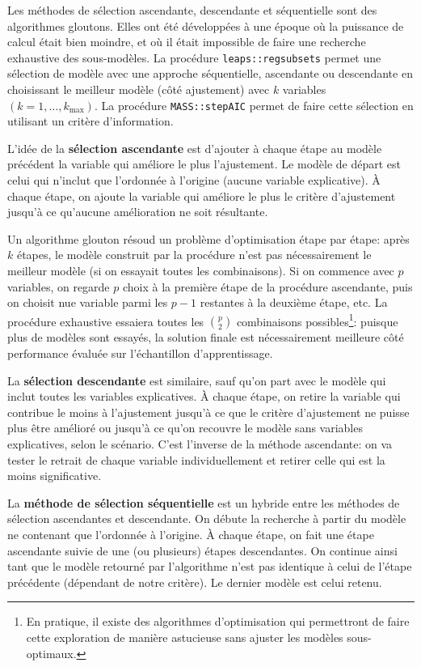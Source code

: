 \documentclass[
  11pt,
  letterpaper,
]{scrbook}
\theoremstyle{definition}
\theoremstyle{remark}
\begin{document}
Les méthodes de sélection ascendante, descendante et séquentielle sont
des algorithmes gloutons. Elles ont été développées à une époque où la
puissance de calcul était bien moindre, et où il était impossible de
faire une recherche exhaustive des sous-modèles. La procédure
\texttt{leaps::regsubsets} permet une sélection de modèle avec une
approche séquentielle, ascendante ou descendante en choisissant le
meilleur modèle (côté ajustement) avec \(k\) variables
\((k=1, \ldots, k_{\text{max}})\). La procédure \texttt{MASS::stepAIC}
permet de faire cette sélection en utilisant un critère d'information.

L'idée de la \textbf{sélection ascendante} est d'ajouter à chaque étape
au modèle précédent la variable qui améliore le plus l'ajustement. Le
modèle de départ est celui qui n'inclut que l'ordonnée à l'origine
(aucune variable explicative). À chaque étape, on ajoute la variable qui
améliore le plus le critère d'ajustement jusqu'à ce qu'aucune
amélioration ne soit résultante.

Un algorithme glouton résoud un problème d'optimisation étape par étape:
après \(k\) étapes, le modèle construit par la procédure n'est pas
nécessairement le meilleur modèle (si on essayait toutes les
combinaisons). Si on commence avec \(p\) variables, on regarde \(p\)
choix à la première étape de la procédure ascendante, puis on choisit
nue variable parmi les \(p-1\) restantes à la deuxième étape, etc. La
procédure exhaustive essaiera toutes les \(\binom{p}{2}\) combinaisons
possibles\footnote{En pratique, il existe des algorithmes d'optimisation
  qui permettront de faire cette exploration de manière astucieuse sans
  ajuster les modèles sous-optimaux.}: puisque plus de modèles sont
essayés, la solution finale est nécessairement meilleure côté
performance évaluée sur l'échantillon d'apprentissage.

La \textbf{sélection descendante} est similaire, sauf qu'on part avec le
modèle qui inclut toutes les variables explicatives. À chaque étape, on
retire la variable qui contribue le moins à l'ajustement jusqu'à ce que
le critère d'ajustement ne puisse plus être amélioré ou jusqu'à ce qu'on
recouvre le modèle sans variables explicatives, selon le scénario. C'est
l'inverse de la méthode ascendante: on va tester le retrait de chaque
variable individuellement et retirer celle qui est la moins
significative.

La \textbf{méthode de sélection séquentielle} est un hybride entre les
méthodes de sélection ascendantes et descendante. On débute la recherche
à partir du modèle ne contenant que l'ordonnée à l'origine. À chaque
étape, on fait une étape ascendante suivie de une (ou plusieurs) étapes
descendantes. On continue ainsi tant que le modèle retourné par
l'algorithme n'est pas identique à celui de l'étape précédente
(dépendant de notre critère). Le dernier modèle est celui retenu.
\end{document}
